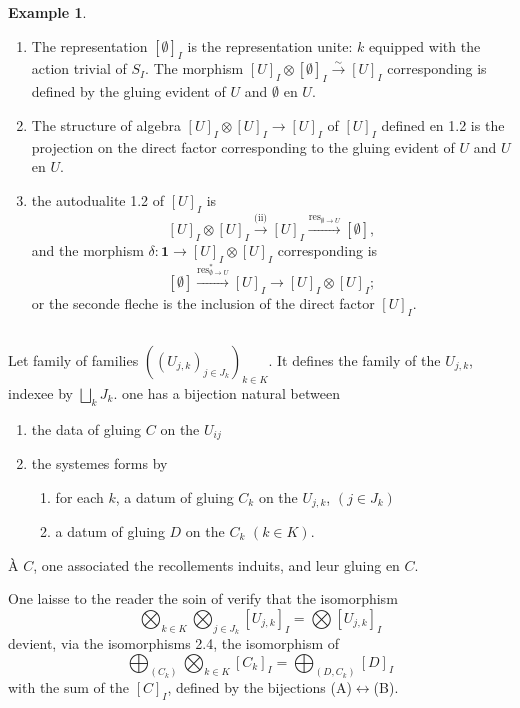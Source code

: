 \documentclass[11pt,a4paper]{article}
\theoremstyle{plain}
\theoremstyle{definition}
\newtheorem{example}[theorem]{Example}
\DeclareMathOperator{\res}{res}
\newcommand{\isom}{\xrightarrow{\sim}}
\begin{document}
\begin{example}
\begin{enumerate}[label=(\roman*)]
\item The representation $[\emptyset]_I$ is the representation unite: $k$ equipped with the action trivial of $S_I$. The morphism $[U]_I \otimes [\emptyset]_I \isom [U]_I$ corresponding is defined by the gluing evident of $U$ and $\emptyset$ en $U$.
\item The structure of algebra $[U]_I \otimes [U]_I \to [U]_I$ of $[U]_I$ defined en 1.2 is the projection on the direct factor corresponding to the gluing evident of $U$ and $U$ en $U$.
\item the autodualite 1.2 of $[U]_I$ is
\[
[U]_I \otimes [U]_I \xrightarrow{\text{(ii)}} [U]_I \xrightarrow{\res_{\emptyset \to U}} [\emptyset],
\]
and the morphism $\delta : \mathbf{1} \to [U]_I \otimes [U]_I$ corresponding is
\[
[\emptyset] \xrightarrow{\res^*_{\emptyset \to U}} [U]_I \to [U]_I \otimes [U]_I;
\]
or the seconde fleche is the inclusion of the direct factor $[U]_I$.
\end{enumerate}
\end{example}

\subsection{}
Let family of families $((U_{j,k})_{j \in J_k})_{k \in K}$. It defines the family of the $U_{j,k}$, indexee by $\bigsqcup_k J_k$. one has a bijection natural between
\begin{enumerate}[label=(\Alph*)]
\item the data of gluing $C$ on the $U_{ij}$
\item the systemes forms by
\begin{enumerate}
\item for each $k$, a datum of gluing $C_k$ on the $U_{j,k}$, $(j \in J_k)$
\item a datum of gluing $D$ on the $C_k$ $(k \in K)$.
\end{enumerate}
\end{enumerate}
\`A $C$, one associated the recollements induits, and leur gluing en $C$.

One laisse to the reader the soin of verify that the isomorphism
\[
\bigotimes_{k \in K} \bigotimes_{j \in J_k} [U_{j,k}]_I = \bigotimes [U_{j,k}]_I
\]
devient, via the isomorphisms 2.4, the isomorphism of
\[
\bigoplus_{(C_k)} \bigotimes_{k \in K} [C_k]_I = \bigoplus_{(D, C_k)} [D]_I
\]
with the sum of the $[C]_I$, defined by the bijections (A)$\leftrightarrow$(B).
\end{document}
